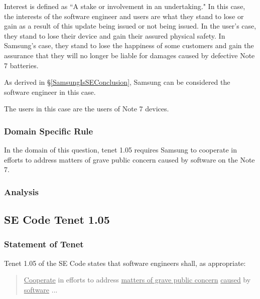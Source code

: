 \documentclass[12pt]{article}
\newcounter{subsubsubsection}[subsubsection]
\begin{document}
      Interest is defined as ``A stake or involvement in an undertaking."\cite{oxfordDefineInterest} In this case, the interests of the software engineer and users are what they stand to lose or gain as a result of this update being issued or not being issued. In the user's case, they stand to lose their device and gain their assured physical safety. In Samsung's case, they stand to lose the happiness of some customers and gain the assurance that they will no longer be liable for damages caused by defective Note 7 batteries.
      
      As derived in \S\ref{SamsungIsSEConclusion}, Samsung can be considered the software engineer in this case.
      
      The users in this case are the users of Note 7 devices.
      
   
   \subsubsection{Domain Specific Rule}
      In the domain of this question, tenet 1.05 requires Samsung to cooperate in efforts to address matters of grave public concern caused by software on the Note 7.
  
   \subsubsection{Analysis}
\fi      
   
\iffalse      
\subsection{SE Code Tenet 1.05}

   \subsubsection{Statement of Tenet}
      Tenet 1.05 of the SE Code states that software engineers shall, as appropriate:
      
      \begin{quote}
		\uline{Cooperate} in efforts to address \uline{matters of grave public concern} \uline{caused} by \uline{software} ...\cite{codeOfEthics}
      \end{quote}
   
\end{document}
